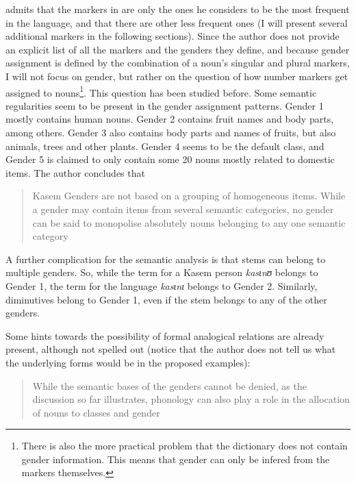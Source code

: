 \textcite[249]{Awedoba.1980} admits that the markers in  are only the ones he considers to be the most frequent in the language, and that there are other less frequent ones (I will present several additional markers in the following sections). Since the author does not provide an explicit list of all the markers and the genders they define, and because gender assignment is defined by the combination of a noun's singular and plural markers, I will not focus on gender, but rather on the question of how number markers get assigned to nouns\footnote{There is also the more practical problem that the dictionary does not contain gender information. This means that gender can only be infered from the markers themselves.}. This question has been studied before. Some semantic regularities seem to be present in the gender assignment patterns. Gender 1 mostly contains human nouns. Gender 2 contains fruit names and body parts, among others. Gender 3 also contains body parts and names of fruits, but also animals, trees and other plants. Gender 4 seems to be the default class, and Gender 5 is claimed to only contain some 20 nouns mostly related to domestic items. The author concludes that

\begin{quotation}
Kasem Genders are not based on a grouping of homogeneous items. While a gender may contain items from several semantic categories, no gender can be said to monopolise absolutely nouns belonging to any one semantic category \autocite[7]{Awedoba.2003}
\end{quotation}

A further complication for the semantic analysis is that stems can belong to multiple genders. So, while the term for a Kasem person \textit{kasɩnʊ} belongs to Gender 1, the term for the language \textit{kasɩnɩ} belongs to Gender 2. Similarly, diminutives belong to Gender 1, even if the stem belongs to any of the other genders.

Some hints towards the possibility of formal analogical relations are already present, although not spelled out (notice that the author does not tell us what the underlying forms would be in the proposed examples):

\begin{quotation}
  While the semantic bases of the genders cannot be denied, as the discussion so far illustrates, phonology can also play a role in the allocation of nouns to classes and gender \autocite[12]{Awedoba.2003}
\end{quotation}

